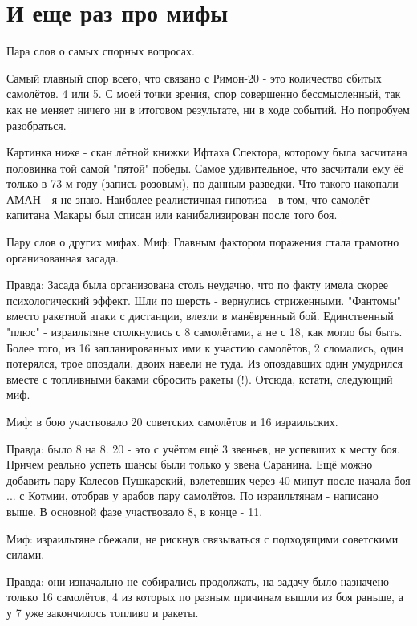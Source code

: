 \chapter{И еще раз про мифы}

Пара слов о самых спорных вопросах.

Самый главный спор всего, что связано с Римон-20 - это количество сбитых самолётов. 4 или 5. С моей точки зрения, спор совершенно бессмысленный, так как не меняет ничего ни в итоговом результате, ни в ходе событий. Но попробуем разобраться.

Картинка ниже - скан лётной книжки Ифтаха Спектора, которому была засчитана половинка той самой "пятой" победы. Самое удивительное, что засчитали ему ёё только в 73-м году (запись розовым), по данным разведки. Что такого накопали АМАН - я не знаю. Наиболее реалистичная гипотиза - в том, что самолёт капитана Макары был списан или канибализирован после того боя.

Пару слов о других мифах.
Миф: Главным фактором поражения стала грамотно организованная засада.

Правда: Засада была организована столь неудачно, что по факту имела скорее психологический эффект. Шли по шерсть - вернулись стриженными. "Фантомы" вместо ракетной атаки с дистанции, влезли в манёвренный бой. Единственный "плюс" - израильтяне столкнулись с 8 самолётами, а не с 18, как могло бы быть. Более того, из 16 запланированных ими к участию самолётов, 2 сломались, один потерялся, трое опоздали, двоих навели не туда. Из опоздавших один умудрился вместе с топливными баками сбросить ракеты (!). Отсюда, кстати, следующий миф.

Миф: в бою участвовало 20 советских самолётов и 16 израильских.

Правда: было 8 на 8. 20 - это с учётом ещё 3 звеньев, не успевших к месту боя. Причем реально успеть шансы были только у звена Саранина. Ещё можно добавить пару Колесов-Пушкарский, взлетевших через 40 минут после начала боя ... с Котмии, отобрав у арабов пару самолётов.
По израильтянам - написано выше. В основной фазе участвовало 8, в конце - 11.

Миф: израильтяне сбежали, не рискнув связываться с подходящими советскими силами.

Правда: они изначально не собирались продолжать, на задачу было назначено только 16 самолётов, 4 из которых по разным причинам вышли из боя раньше, а у 7 уже закончилось топливо и ракеты.
